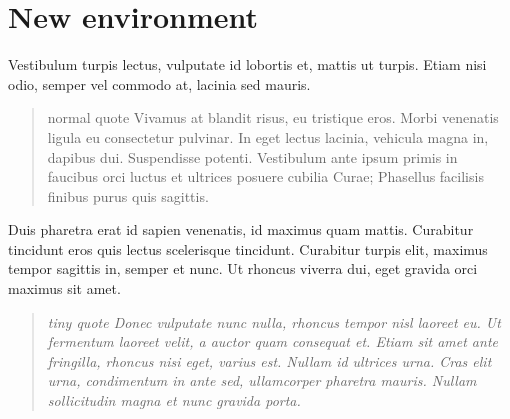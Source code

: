 \chapter{New environment}
\newenvironment{tinyitalicsquote}{\begin{quote}\tiny\itshape}{\end{quote}}


Vestibulum turpis lectus, vulputate id lobortis et, mattis ut turpis. Etiam nisi odio, semper vel commodo at, lacinia sed mauris.

\begin{quote}
 normal quote 
 Vivamus at blandit risus, eu tristique eros. Morbi venenatis ligula eu consectetur pulvinar. In eget lectus lacinia, vehicula magna in, dapibus dui. Suspendisse potenti. Vestibulum ante ipsum primis in faucibus orci luctus et ultrices posuere cubilia Curae; Phasellus facilisis finibus purus quis sagittis.

  
\end{quote}

Duis pharetra erat id sapien venenatis, id maximus quam mattis. Curabitur tincidunt eros quis lectus scelerisque tincidunt. Curabitur turpis elit, maximus tempor sagittis in, semper et nunc. Ut rhoncus viverra dui, eget gravida orci maximus sit amet.
\begin{tinyitalicsquote}
 tiny quote 
  Donec vulputate nunc nulla, rhoncus tempor nisl laoreet eu. Ut fermentum laoreet velit, a auctor quam consequat et. Etiam sit amet ante fringilla, rhoncus nisi eget, varius est. Nullam id ultrices urna. Cras elit urna, condimentum in ante sed, ullamcorper pharetra mauris. Nullam sollicitudin magna et nunc gravida porta. 

\end{tinyitalicsquote}

